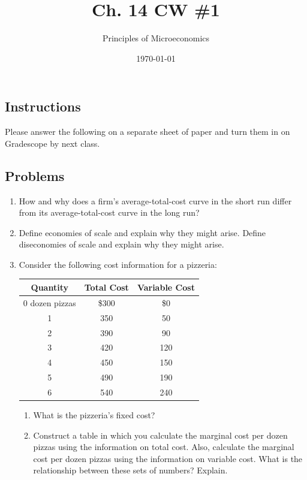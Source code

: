 \documentclass{article}
\title{Ch. 14 CW \#1}
\author{Principles of Microeconomics}
\date{\today}
\begin{document}
\maketitle

\subsection*{Instructions} Please answer the following on a separate sheet of paper and turn them in on Gradescope by next class.

\subsection*{Problems}

\begin{enumerate}

\item How and why does a firm's average-total-cost curve in the short run differ from its average-total-cost curve in the long run?

\item Define economies of scale and explain why they might arise. Define diseconomies of scale and explain why they might arise.

\item Consider the following cost information for a pizzeria:

	\begin{center}
	\begin{tabular}{c | c | c}
	\textbf{Quantity} & \textbf{Total Cost} & \textbf{Variable Cost} \\
	\hline
	0 dozen pizzas & \$300 & \$0 \\
	1 & 350 & 50 \\
	2 & 390 & 90 \\
	3 & 420 & 120 \\
	4 & 450 & 150 \\
	5 & 490 & 190 \\
	6 & 540 & 240 \\
	\end{tabular}
	\end{center}
	
	\begin{enumerate}
	
	\item What is the pizzeria's fixed cost?
	
	\item Construct a table in which you calculate the marginal cost per dozen pizzas using the information on total cost. Also, calculate the marginal cost per dozen pizzas using the information on variable cost. What is the relationship between these sets of numbers? Explain.
	

\end{enumerate}
\end{enumerate}
\end{document}
